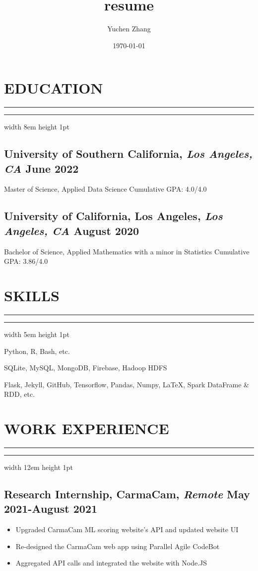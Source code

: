 \documentclass[11pt]{article}
\title{resume}
\author{Yuchen Zhang}
\date{\today}
\newcommand{\divider}[1]{%
	\vskip-2pt %
	{%
		\color{black}%
		\hrule%
	}%
	\nointerlineskip%
	\noindent%
	{%
		\color{black}%
		\hrule width #1 height 1pt%
	}%
	\vskip5pt%
}
\begin{document}
\section*{EDUCATION}
\divider{8em}
\subsection*{University of Southern California{\normalfont, \textit{Los Angeles, CA} \hfill June 2022}}
\noindent
Master of Science, Applied Data Science
\hfill
Cumulative GPA: 4.0/4.0

\vspace{0.1in}

\subsection*{University of California, Los Angeles{\normalfont, \textit{Los Angeles, CA} \hfill August 2020}}
\noindent
Bachelor of Science, Applied Mathematics with a minor in Statistics 
\hfill 
Cumulative GPA: 3.86/4.0

\vspace{0.1in}

\section*{SKILLS}
\divider{5em}
\begin{description}
    \setlength\itemsep{-1pt}
    \item[Programming Languages] Python, R, Bash, etc.
    \item[Database Management] SQLite, MySQL, MongoDB, Firebase, Hadoop HDFS
    \item[Tools] Flask, Jekyll, GitHub, Tensorflow, Pandas, Numpy, \LaTeX, 
        Spark DataFrame \& RDD, etc.
\end{description}

\section*{WORK EXPERIENCE}
\divider{12em}
\subsection*{Research Internship{\normalfont, CarmaCam, \textit{Remote} \hfill May 2021-August 2021}}
\begin{itemize}
    \setlength\itemsep{-1pt}
    \item Upgraded CarmaCam ML scoring website's API and updated website UI
    \item Re-designed the CarmaCam web app using Parallel Agile\textregistered\xspace CodeBot\textregistered
    \item Aggregated API calls and integrated the website with Node.JS
\end{itemize}
\end{document}

